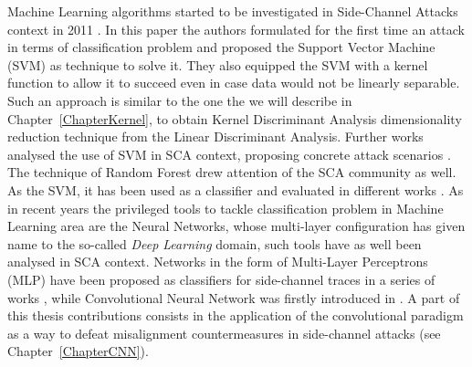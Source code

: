 Machine Learning algorithms started to be investigated in Side-Channel Attacks context in 2011 \cite{machineLearningSCA}. In this paper the authors formulated for the first time an attack in terms of classification problem and proposed the Support Vector Machine (SVM) \cite{cortes1995support,weston1998multi} as technique to solve it. They also equipped the SVM with a kernel function to allow it to succeed even in case data would not be linearly separable. Such an approach is similar to the one the we will describe in Chapter~\ref{ChapterKernel}, to obtain Kernel Discriminant Analysis dimensionality reduction technique from the Linear Discriminant Analysis. Further works analysed the use of SVM in SCA context, proposing concrete attack scenarios \cite{intelligentMachineOmicide,effTA_SVM}. 
The technique of Random Forest \cite{lior2014data} drew attention of the SCA community as well. As the SVM, it has been used as a classifier and evaluated in different works \cite{lerman2015machine,lerman2015template,lerman2014power}. As in recent years the privileged tools to tackle classification problem in Machine Learning area are the Neural Networks, whose multi-layer configuration has given name to the so-called \emph{Deep Learning} domain, such tools have as well been analysed in SCA context. Networks in the form of Multi-Layer Perceptrons (MLP) have been proposed as classifiers for side-channel traces in a series of works \cite{martinasek2013optimization,martinasek2013innovative,martinasek2015profiling,martinasek2016profiling}, while Convolutional Neural Network was firstly introduced in \cite{maghrebi2016breaking}. A part of this thesis contributions consists in the application of the convolutional paradigm as a way to defeat misalignment countermeasures in side-channel attacks (see Chapter~\ref{ChapterCNN}).


